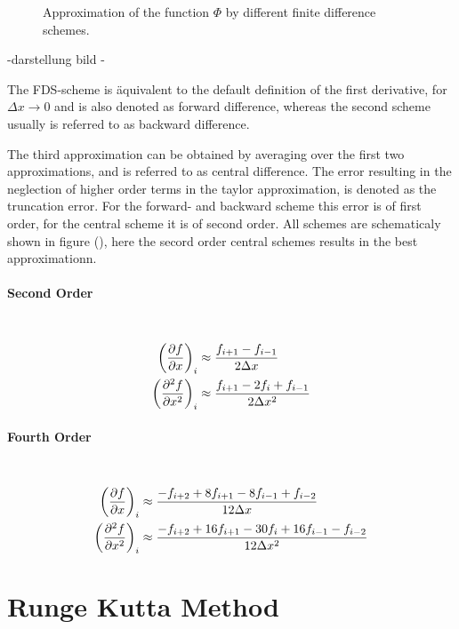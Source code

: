 \begin{figure}[!btp]
  \centering
  \caption{Approximation of the function $\Phi$ by different finite difference schemes.}
\end{figure}



-darstellung bild
-


The FDS-scheme is äquivalent to the default definition of the first derivative, for $\Delta x \rightarrow 0$ and is also
denoted as forward difference, whereas the second scheme usually is referred to as backward difference.

The third approximation can be obtained by averaging over the first two approximations, and  is referred to as central difference.
The error resulting in the neglection of higher order terms in the taylor approximation, is denoted as the truncation error.
For the forward- and backward scheme this error is of first order, for the central scheme it is of second order.
All schemes are schematicaly shown in figure (), here the secord order central schemes results in the best approximationn.
\citep{Fornberg1988}


\paragraph{Second Order}\mbox{}\\
\begin{align}
    \left(\pdn[f]{x}\right)_i &\approx \frac{f_{i+1} - f_{i-1}}{2\Delta x} \\
    \left(\pdn[^2f]{x^2}\right)_i &\approx \frac{f_{i+1} - 2 f_i +  f_{i-1}}{2\Delta x^2}
\end{align}
\paragraph{Fourth Order}\mbox{}\\
\begin{align}
    \left(\pdn[f]{x}\right)_i &\approx \frac{-f_{i+2} + 8f_{i+1} - 8f_{i-1} + f_{i-2}}{12\Delta x} \\
    \left(\pdn[^2f]{x^2}\right)_i &\approx \frac{-f_{i+2} + 16f_{i+1} -30f_i + 16f_{i-1} - f_{i-2}}{12\Delta x^2} \\
\end{align}

\newpage

\section{Runge Kutta Method}

